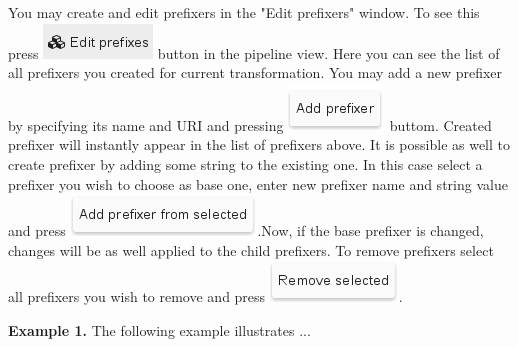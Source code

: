 \documentclass[USenglish]{article}
\begin{document}
You may create and edit prefixers in the "Edit prefixers" window. To see this press {\includegraphics[scale=0.5]{editprefixers.png}} button in the pipeline view. Here you can see the list of all prefixers you created for current transformation. You may add a new prefixer by specifying its name and URI and pressing {\includegraphics[scale=0.5]{addprefixer.png}} buttom. Created prefixer will instantly appear in the list of prefixers above. It is possible as well to create prefixer by adding some string to the existing one. In this case select a prefixer you wish to choose as base one, enter new prefixer name and string value and press  {\includegraphics[scale=0.5]{addprefixerfrom.png}}.Now, if the base prefixer is changed, changes will be as well applied to the child prefixers. To remove prefixers select all prefixers you wish to remove and press  {\includegraphics[scale=0.5]{removeprefixers.png}}.


\begin{mdframed}[hidealllines=true,backgroundcolor=gray!10]
\textbf{Example 1.}
The following example illustrates ...
\end{mdframed}
\end{document}
